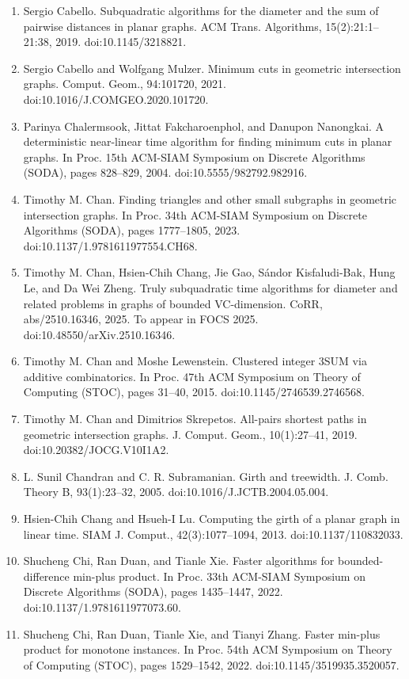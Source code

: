 \begin{enumerate}
\item[]  [11]  Sergio Cabello.  Subquadratic algorithms for the diameter and the sum of pairwise distances in planar graphs.  ACM Trans. Algorithms, 15(2):21:1–21:38, 2019.  doi:10.1145/3218821.  
\item[]  [12]  Sergio Cabello and Wolfgang Mulzer.  Minimum cuts in geometric intersection graphs.  Comput. Geom., 94:101720, 2021.  doi:10.1016/J.COMGEO.2020.101720.  
\item[]  [13]  Parinya Chalermsook, Jittat Fakcharoenphol, and Danupon Nanongkai.  A deterministic near-linear time algorithm for finding minimum cuts in planar graphs.  In Proc. 15th ACM-SIAM Symposium on Discrete Algorithms (SODA), pages 828–829, 2004.  doi:10.5555/982792.982916.  
\item[]  [14]  Timothy M. Chan.  Finding triangles and other small subgraphs in geometric intersection graphs.  In Proc. 34th ACM-SIAM Symposium on Discrete Algorithms (SODA), pages 1777–1805, 2023.  doi:10.1137/1.9781611977554.CH68.  
\item[]  [15]  Timothy M. Chan, Hsien-Chih Chang, Jie Gao, Sándor Kisfaludi-Bak, Hung Le, and Da Wei Zheng.  Truly subquadratic time algorithms for diameter and related problems in graphs of bounded VC-dimension.  CoRR, abs/2510.16346, 2025.  To appear in FOCS 2025.  doi:10.48550/arXiv.2510.16346.  
\item[]  [16]  Timothy M. Chan and Moshe Lewenstein.  Clustered integer 3SUM via additive combinatorics.  In Proc. 47th ACM Symposium on Theory of Computing (STOC), pages 31–40, 2015.  doi:10.1145/2746539.2746568.  
\item[]  [17]  Timothy M. Chan and Dimitrios Skrepetos.  All-pairs shortest paths in geometric intersection graphs.  J. Comput. Geom., 10(1):27–41, 2019.  doi:10.20382/JOCG.V10I1A2.  
\item[]  [18]  L. Sunil Chandran and C. R. Subramanian.  Girth and treewidth.  J. Comb. Theory B, 93(1):23–32, 2005.  doi:10.1016/J.JCTB.2004.05.004.  
\item[]  [19]  Hsien-Chih Chang and Hsueh-I Lu.  Computing the girth of a planar graph in linear time.  SIAM J. Comput., 42(3):1077–1094, 2013.  doi:10.1137/110832033.  
\item[]  [20]  Shucheng Chi, Ran Duan, and Tianle Xie.  Faster algorithms for bounded-difference min-plus product.  In Proc. 33th ACM-SIAM Symposium on Discrete Algorithms (SODA), pages 1435–1447, 2022.  doi:10.1137/1.9781611977073.60.  
\item[]  [21]  Shucheng Chi, Ran Duan, Tianle Xie, and Tianyi Zhang.  Faster min-plus product for monotone instances.  In Proc. 54th ACM Symposium on Theory of Computing (STOC), pages 1529–1542, 2022.  doi:10.1145/3519935.3520057.  

\end{enumerate}
